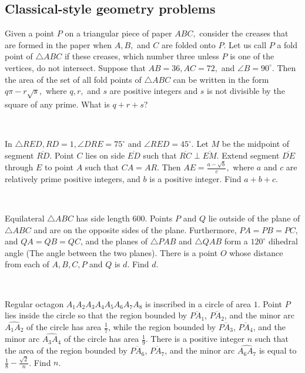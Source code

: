 \documentclass[mast]{lucky}
\begin{document}
\subsection{Classical-style geometry problems}
\begin{prob}[AIME 1994/15]{4}
Given a point $P$ on a triangular piece of paper $ABC,$ consider the creases that are formed in the paper when $A, B,$ and $C$ are folded onto $P.$ Let us call $P$ a fold point of $\triangle ABC$ if these creases, which number three unless $P$ is one of the vertices, do not intersect. Suppose that $AB=36, AC=72,$ and $\angle B=90^\circ.$ Then the area of the set of all fold points of $\triangle ABC$ can be written in the form $q\pi-r\sqrt{s},$ where $q, r,$ and $s$ are positive integers and $s$ is not divisible by the square of any prime. What is $q+r+s$?
\end{prob}\\
\begin{prob}[AIME I 2014/11]{6}
In $\triangle RED, RD =1, \angle DRE = 75^\circ$ and $\angle RED = 45^\circ$. Let $M$ be the midpoint of segment $\overline{RD}$. Point $C$ lies on side $\overline{ED}$ such that $\overline{RC} \perp \overline{EM}$. Extend segment $\overline{DE}$ through $E$ to point $A$ such that $CA = AR$. Then $AE = \tfrac{a-\sqrt{b}}{c},$ where $a$ and $c$ are relatively prime positive integers, and $b$ is a positive integer. Find $a+b+c$.	
\end{prob}\\
\begin{prob}[AIME II 2016/14]{6}
Equilateral $\triangle ABC$ has side length $600$. Points $P$ and $Q$ lie outside of the plane of $\triangle ABC$ and are on the opposite sides of the plane. Furthermore, $PA=PB=PC$, and $QA=QB=QC$, and the planes of $\triangle PAB$ and $\triangle QAB$ form a $120^{\circ}$ dihedral angle (The angle between the two planes). There is a point $O$ whose distance from each of $A,B,C,P$ and $Q$ is $d$. Find $d$.	
\end{prob}\\
\begin{prob}[AIME II 2019/13]{6}
Regular octagon $A_1A_2A_3A_4A_5A_6A_7A_8$ is inscribed in a circle of area $1$. Point $P$ lies inside the circle so that the region bounded by $\overline{PA_1}$, $\overline{PA_2}$, and the minor arc $\widehat{A_1A_2}$ of the circle has area $\tfrac17$, while the region bounded by $\overline{PA_3}$, $\overline{PA_4}$, and the minor arc $\widehat{A_3A_4}$ of the circle has area $\tfrac 19$. There is a positive integer $n$ such that the area of the region bounded by $\overline{PA_6}$, $\overline{PA_7}$, and the minor arc $\widehat{A_6A_7}$ is equal to $\tfrac18 - \tfrac{\sqrt 2}n$. Find $n$.
\end{prob}\\
\end{document}
